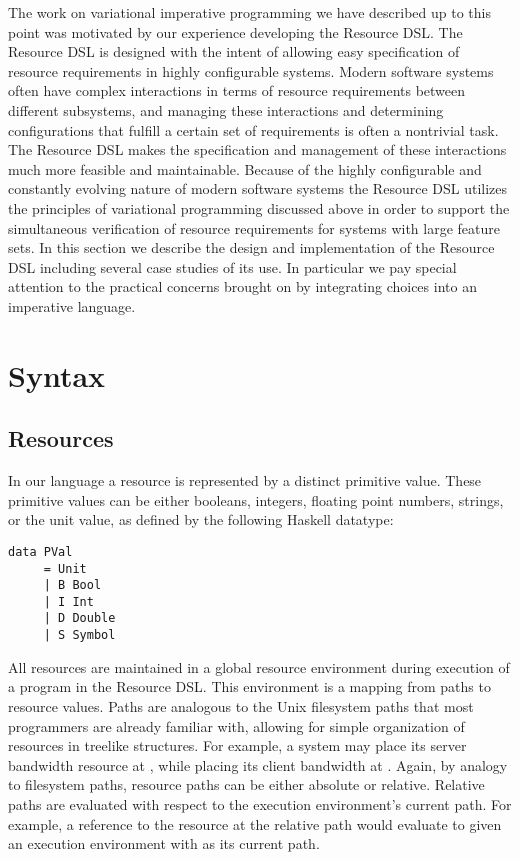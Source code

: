 \documentclass[12pt,oneside]{book}
\begin{document}
The work on variational imperative programming we have described up to this point was motivated
by our experience developing the Resource DSL. The Resource DSL is designed with the intent of
allowing easy specification of resource requirements in highly configurable systems. Modern software
systems often have complex interactions in terms of resource requirements between different subsystems,
and managing these interactions and determining configurations that fulfill a certain set of requirements
is often a nontrivial task. The Resource DSL makes the specification and management
of these interactions much more feasible and maintainable. Because of the highly configurable and constantly evolving
nature of modern software systems the Resource DSL utilizes the principles of variational programming
discussed above in order to support the simultaneous verification of resource requirements for
systems with large feature sets. In this section we describe the design and implementation of the
Resource DSL including several case studies of its use. In particular we pay special attention to the
practical concerns brought on by integrating choices into an imperative language.

\section{Syntax}

\subsection{Resources}

In our language a resource is represented by a distinct primitive value. These primitive values
can be either booleans, integers, floating point numbers, strings, or the unit value, as defined
by the following Haskell datatype:

\begin{lstlisting}
data PVal
     = Unit
     | B Bool
     | I Int
     | D Double
     | S Symbol
\end{lstlisting}

All resources are maintained in a global resource environment during execution of a program
in the Resource DSL. This environment is a mapping from paths to resource values. Paths are
analogous to the Unix filesystem paths that most programmers are already familiar with, allowing for
simple organization of resources in treelike structures. For example, a system may place its server
bandwidth resource at , while placing its client bandwidth at .
Again, by analogy to filesystem paths, resource paths can be either absolute or relative. Relative paths are
evaluated with respect to the execution environment's current path. For example, a reference to the resource
at the relative path  would evaluate to 
given an execution environment with  as its current path.
\end{document}
